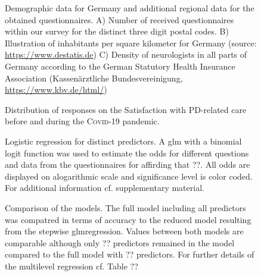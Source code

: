 \documentclass{bmcart}
\begin{document}
\begin{backmatter}
\begin{figure}[h!]
\begin{subfigure}[b]{0.35\linewidth}
        \label{fig1:neurologists}
    \end{subfigure}%
\caption{Demographic data for Germany and additional regional data for the obtained questionnaires. A) Number of received questionnaires within our survey for the distinct three digit postal codes. B) Illustration of inhabitants per square kilometer for Germany (source: \url{https://www.destatis.de}) C) Density of neurologists in all parts of Germany according to the German Statutory Health Insurance Association (Kassenärztliche Bundesvereinigung, \url{https://www.kbv.de/html/})}
\label{fig1:total}
\end{figure}
	
\newpage	
\begin{figure}[h!]

\caption{Distribution of responses on the Satisfaction with PD-related care before and during the \textsc{Covid}-19 pandemic.}
\end{figure}

\newpage	
\begin{landscape}
\begin{figure}[h!]

\caption{Logistic regression for distinct predictors. A \ac{glm} with a binomial logit function was used to estimate the odds for different questions and data from the questionnaires for affirding that ??. All odds are displayed on alogarithmic scale and significance level is color coded. For additional information cf. supplementary material.}
\end{figure}
\end{landscape}

\newpage
\begin{figure}[h!]

\caption{Comparison of the models. The full model including all predictors was compatred in terms of accuracy to the reduced model resulting from the stepwise \ac{glm}regression. Values between both models are comparable although only ?? predictors remained in the model compared to the full model with ?? predictors. For further details of the multilevel regression cf. Table ??}
\end{figure}


		

\end{backmatter}
\end{document}
